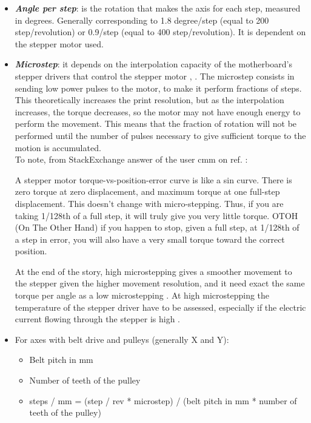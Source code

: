 \begin{itemize}
\item \emph{\textbf{Angle per step}}: is the rotation that makes the axis for each step, measured in degrees. Generally corresponding to 1.8 degree/step (equal to 200 step/revolution) or 0.9/step (equal to 400 step/revolution). It is dependent on the stepper motor used.
\item \emph{\textbf{Microstep}}: it depends on the interpolation capacity of the motherboard's stepper drivers that control the stepper motor \parencite{Reference5}, \parencite{Reference6}. The microstep consists in sending low power pulses to the motor, to make it perform fractions of steps. This theoretically increases the print resolution, but as the interpolation increases, the torque decreases, so the motor may not have enough energy to perform the movement. This means that the fraction of rotation will not be performed until the number of pulses necessary to give sufficient torque to the motion is accumulated.\\ To note, from StackExchange answer of the user cmm \parencite{Reference149} on ref. \parencite{Reference6}:

\begin{displayquote}
A stepper motor torque-vs-position-error curve is like a sin curve.  There is zero torque at zero displacement, and maximum torque at one full-step displacement. This doesn't change with micro-stepping. Thus, if you are taking 1/128th of a full step, it will truly give you very little torque.  OTOH (On The Other Hand) if you happen to stop, given a full step, at 1/128th of a step in error, you will also have a very small torque toward the correct position.
\end{displayquote}

At the end of the story, high microstepping gives a smoother movement to the stepper given the higher movement resolution, and it need exact the same torque per angle as a low microstepping \parencite{Reference150}. At high microstepping the temperature of the stepper driver have to be assessed, especially if the electric current flowing through the stepper is high \parencite{Reference151}.

\item For axes with belt drive and pulleys (generally X and Y):

\begin{itemize}
\item Belt pitch in mm
\item Number of teeth of the pulley
\item steps / mm = (step / rev * microstep) / (belt pitch in mm * number of teeth of the pulley)
\end{itemize}


\end{itemize}
